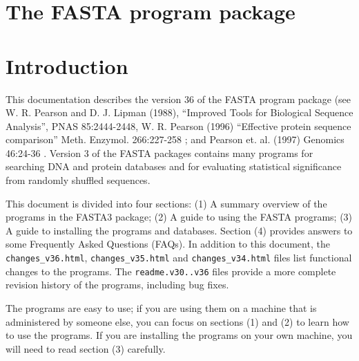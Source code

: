 \documentclass[11pt]{article}
\begin{document}

\section*{\Large{The FASTA program package}}


\section*{Introduction}

This documentation describes the version 36 of the FASTA program
package (see W. R. Pearson and D. J. Lipman (1988), ``Improved Tools
for Biological Sequence Analysis'', PNAS 85:2444-2448,\cite{wrp881}
W. R. Pearson (1996) ``Effective protein sequence comparison''
Meth. Enzymol. 266:227-258 \cite{wrp960}; and Pearson et. al. (1997)
Genomics 46:24-36 \cite{wrp973}.  Version 3 of the FASTA packages
contains many programs for searching DNA and protein databases and for
evaluating statistical significance from randomly shuffled sequences.

This document is divided into four sections: (1) A summary overview of
the programs in the FASTA3 package; (2) A guide to using the FASTA
programs; (3) A guide to installing the programs and
databases. Section (4) provides answers to some Frequently Asked
Questions (FAQs).  In addition to this document, the
\texttt{changes\_v36.html}, \texttt{changes\_v35.html} and
\texttt{changes\_v34.html} files list functional changes to the programs.
The \texttt{readme.v30..v36} files provide a more complete revision
history of the programs, including bug fixes.

The programs are easy to use; if you are using them on a machine that
is administered by someone else, you can focus on sections (1) and (2)
to learn how to use the programs.  If you are installing the programs
on your own machine, you will need to read section (3) carefully.
\end{document}
